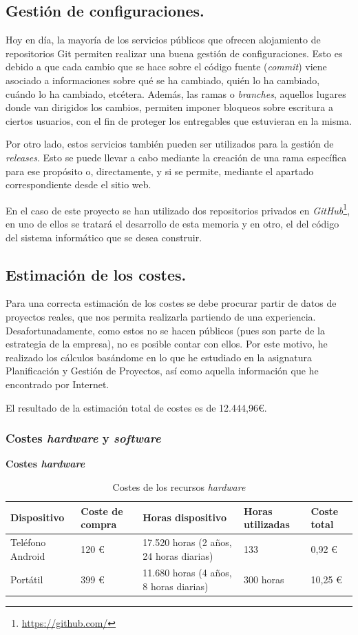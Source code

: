 \documentclass[twoside]{report}
\begin{document}
\subsection{Gestión de configuraciones.}

Hoy en día, la mayoría de los servicios públicos que ofrecen alojamiento de repositorios Git permiten realizar una buena gestión de configuraciones. Esto es debido a que cada cambio que se hace sobre el código fuente (\textit{commit}) viene asociado a informaciones sobre qué se ha cambiado, quién lo ha cambiado, cuándo lo ha cambiado, etcétera. Además, las ramas o \textit{branches}, aquellos lugares donde van dirigidos los cambios, permiten imponer bloqueos sobre escritura a ciertos usuarios, con el fin de proteger los entregables que estuvieran en la misma.

Por otro lado, estos servicios también pueden ser utilizados para la gestión de \textit{releases}. Esto se puede llevar a cabo mediante la creación de una rama específica para ese propósito o, directamente, y si se permite, mediante el apartado correspondiente desde el sitio web.

En el caso de este proyecto se han utilizado dos repositorios privados en \textit{GitHub}\footnote{\url{https://github.com/}}, en uno de ellos se tratará el desarrollo de esta memoria y en otro, el del código del sistema informático que se desea construir.

\subsection{Estimación de los costes.}

Para una correcta estimación de los costes se debe procurar partir de datos de proyectos reales, que nos permita realizarla partiendo de una experiencia. Desafortunadamente, como estos no se hacen públicos (pues son parte de la estrategia de la empresa), no es posible contar con ellos. Por este motivo, he realizado los cálculos basándome en lo que he estudiado en la asignatura \cite{pgptema2} Planificación y Gestión de Proyectos, así como aquella información que he encontrado por Internet.

El resultado de la estimación total de costes es de 12.444,96\euro.

\subsubsection{Costes \textit{hardware} y \textit{software}}
\textbf{Costes \textit{hardware}}
\begin{table}[H]
\center
\begin{tabular}{|l|l|l|l|l|}
\hline
Dispositivo        & Coste de compra   & Horas dispositivo & Horas utilizadas & Coste total \\ \hline
Teléfono Android   & 120 \euro      & 17.520 horas (2 años, 24 horas diarias)  & 133  & 0,92  \euro \\ \hline
Portátil      & 399 \euro   &  11.680 horas (4 años, 8 horas diarias) & 300 horas  & 10,25 \euro \\ \hline
\end{tabular}
\caption{Costes de los recursos \textit{hardware}}
\end{table}
\end{document}
